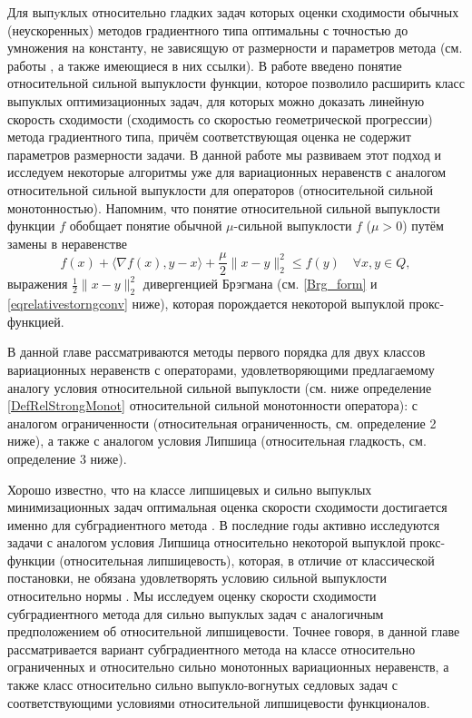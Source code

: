 Для выпyклых относительно гладких задач которых оценки сходимости обычных (неускоренных) методов градиентного типа оптимальны с точностью до умножения на константу, не зависящую от размерности и параметров метода (см. работы \cite{Bauschke,Drag,Dragomir,Lu_Nesterov_2018}, а также имеющиеся в них ссылки). В работе \cite{Lu_Nesterov_2018} введено понятие относительной сильной выпуклости функции, которое позволило расширить класс выпуклых оптимизационных задач, для которых можно доказать линейную скорость сходимости (сходимость со скоростью геометрической прогрессии) метода градиентного типа, причём соответствующая оценка не содержит параметров размерности задачи. В данной работе мы развиваем этот подход и исследуем некоторые алгоритмы уже для вариационных неравенств с аналогом относительной сильной выпуклости для операторов (относительной сильной монотонностью). Напомним, что понятие относительной сильной выпуклости \cite{Lu_Nesterov_2018} функции $f$ обобщает понятие обычной $\mu$-сильной выпуклости $f$ ($\mu > 0$) путём замены в неравенстве 
\begin{equation}
    f(x) + \langle \nabla{f(x)}, y - x \rangle  + \frac{\mu}{2} \|x - y \|_2^2 \leq f(y) \quad   \forall x, y \in Q,
    \end{equation}
выражения $\frac{1}{2} \|x - y \|_2^2 $ дивергенцией Брэгмана (см. \eqref{Brg_form} и \eqref{eqrelativestorngconv} ниже), которая порождается некоторой выпуклой прокс-функцией. 

В данной главе рассматриваются методы первого порядка для двух классов вариационных неравенств с операторами, удовлетворяющими предлагаемому аналогу условия относительной сильной выпуклости (см. ниже определение  \ref{DefRelStrongMonot} относительной сильной монотонности оператора): с аналогом ограниченности (относительная ограниченность, см. определение 2 ниже), а также с аналогом условия Липшица (относительная гладкость, см. определение 3 ниже).

Хорошо известно, что на классе липшицевых и сильно выпуклых минимизационных задач оптимальная оценка скорости сходимости достигается именно для субградиентного метода \cite{Simon_Julien_Bach_2012}. В последние годы активно исследуются задачи с аналогом условия Липшица относительно некоторой выпуклой прокс-функции (относительная липшицевость), которая, в отличие от классической постановки, не обязана удовлетворять условию сильной выпуклости относительно нормы \cite{AdaMirr_2021,Lu_2018,Zhou_NIPS_2020}. Мы исследуем оценку скорости сходимости субградиентного метода для сильно выпуклых задач с аналогичным предположением об относительной липшицевости. Точнее говоря, в данной главе рассматривается вариант субградиентного метода на классе относительно ограниченных и относительно сильно монотонных вариационных неравенств, а также класс относительно сильно выпукло-вогнутых седловых задач с соответствующими условиями относительной липшицевости функционалов. 

